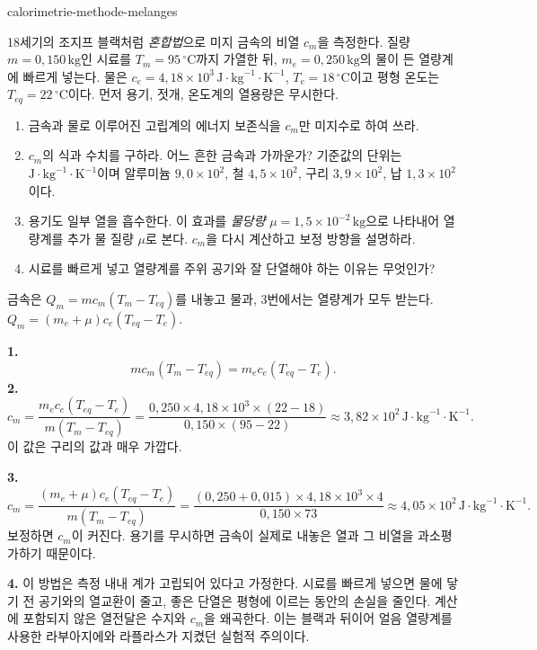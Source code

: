 \begin{exo}{calorimetrie-methode-melanges}

18세기의 조지프 블랙처럼 \emph{혼합법}으로 미지 금속의 비열 $c_m$을 측정한다. 질량 $m=0{,}150\,\text{kg}$인 시료를 $T_m=95\,^\circ\text{C}$까지 가열한 뒤, $m_e=0{,}250\,\text{kg}$의 물이 든 열량계에 빠르게 넣는다. 물은 $c_e=4{,}18\times10^3\,\text{J}\!\cdot\!\text{kg}^{-1}\!\cdot\!\text{K}^{-1}$, $T_e=18\,^\circ\text{C}$이고 평형 온도는 $T_{eq}=22\,^\circ\text{C}$이다. 먼저 용기, 젓개, 온도계의 열용량은 무시한다.
\begin{enumerate}
  \item 금속과 물로 이루어진 고립계의 에너지 보존식을 $c_m$만 미지수로 하여 쓰라.
  \item $c_m$의 식과 수치를 구하라. 어느 흔한 금속과 가까운가? 기준값의 단위는 $\text{J}\!\cdot\!\text{kg}^{-1}\!\cdot\!\text{K}^{-1}$이며 알루미늄 $9{,}0\times10^2$, 철 $4{,}5\times10^2$, 구리 $3{,}9\times10^2$, 납 $1{,}3\times10^2$이다.
  \item 용기도 일부 열을 흡수한다. 이 효과를 \emph{물당량} $\mu=1{,}5\times10^{-2}\,\text{kg}$으로 나타내어 열량계를 추가 물 질량 $\mu$로 본다. $c_m$을 다시 계산하고 보정 방향을 설명하라.
  \item 시료를 빠르게 넣고 열량계를 주위 공기와 잘 단열해야 하는 이유는 무엇인가?
\end{enumerate}
\begin{indication}
금속은 $Q_m=mc_m(T_m-T_{eq})$를 내놓고 물과, 3번에서는 열량계가 모두 받는다. $Q_m=(m_e+\mu)c_e(T_{eq}-T_e)$.
\end{indication}
\begin{solution}
\textbf{1.}
\[
mc_m(T_m-T_{eq})=m_ec_e(T_{eq}-T_e).
\]
\textbf{2.}
\[
c_m=\frac{m_ec_e(T_{eq}-T_e)}{m(T_m-T_{eq})}
=\frac{0{,}250\times4{,}18\times10^3\times(22-18)}{0{,}150\times(95-22)}
\approx3{,}82\times10^2\,\text{J}\!\cdot\!\text{kg}^{-1}\!\cdot\!\text{K}^{-1}.
\]
이 값은 구리의 값과 매우 가깝다.

\textbf{3.}
\[
c_m=\frac{(m_e+\mu)c_e(T_{eq}-T_e)}{m(T_m-T_{eq})}
=\frac{(0{,}250+0{,}015)\times4{,}18\times10^3\times4}{0{,}150\times73}
\approx4{,}05\times10^2\,\text{J}\!\cdot\!\text{kg}^{-1}\!\cdot\!\text{K}^{-1}.
\]
보정하면 $c_m$이 커진다. 용기를 무시하면 금속이 실제로 내놓은 열과 그 비열을 과소평가하기 때문이다.

\textbf{4.} 이 방법은 측정 내내 계가 고립되어 있다고 가정한다. 시료를 빠르게 넣으면 물에 닿기 전 공기와의 열교환이 줄고, 좋은 단열은 평형에 이르는 동안의 손실을 줄인다. 계산에 포함되지 않은 열전달은 수지와 $c_m$을 왜곡한다. 이는 블랙과 뒤이어 얼음 열량계를 사용한 라부아지에와 라플라스가 지켰던 실험적 주의이다.
\end{solution}
\end{exo}

